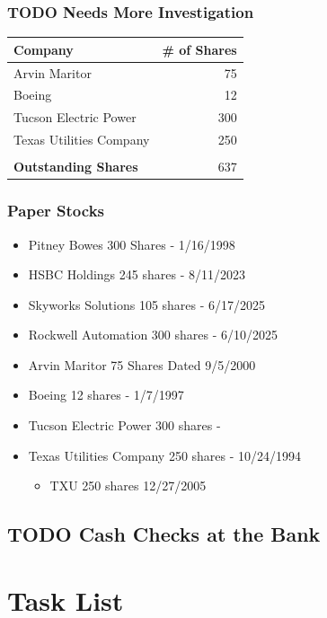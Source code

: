 \documentclass[12pt,twoside]{article}
\begin{document}
\subsubsection{{\bfseries\sffamily TODO} Needs More Investigation}
\label{sec:org5050f71}
\begin{center}
\begin{tabular}{lr}
\hline
\textbf{Company} & \textbf{\# of Shares}\\
\hline
Arvin Maritor & 75\\
Boeing & 12\\
Tucson Electric Power & 300\\
Texas Utilities Company & 250\\
\hline
 & \\
\textbf{Outstanding Shares} & 637\\
\hline
\end{tabular}
\end{center}
\subsubsection{Paper Stocks}
\label{sec:orgf4ae259}
\begin{itemize}
\item Pitney Bowes  300 Shares - 1/16/1998
\item HSBC Holdings 245 shares - 8/11/2023
\item Skyworks Solutions 105 shares - 6/17/2025
\item Rockwell Automation 300 shares - 6/10/2025
\item Arvin Maritor 75 Shares Dated 9/5/2000
\item Boeing 12 shares - 1/7/1997
\item Tucson Electric Power 300 shares -
\item Texas Utilities Company 250 shares - 10/24/1994
\begin{itemize}
\item TXU 250 shares  12/27/2005
\end{itemize}
\end{itemize}
\subsection{{\bfseries\sffamily TODO} Cash Checks at the Bank}
\label{sec:org66d65be}
\section{Task List}
\label{sec:orga1e2abe}
\end{document}

